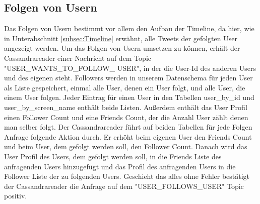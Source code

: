 \subsection{Folgen von Usern}
Das Folgen von Usern bestimmt vor allem den Aufbau der Timeline, da hier, wie in Unterabschnitt \ref{subsec:Timeline} erwähnt, alle Tweets der gefolgten User angezeigt werden. Um das Folgen von Usern umsetzen zu können, erhält der Cassandrareader einer Nachricht auf dem Topic "USER\_WANTS\_TO\_FOLLOW\_ USER", in der die User-Id des anderen Users und des eigenen steht. Followers werden in unserem Datenschema für jeden User als Liste gespeichert, einmal alle User, denen ein User folgt, und alle User, die einem User folgen. Jeder Eintrag für einen User in den Tabellen user\_by\_id und user\_by\_screen\_name enthält beide Listen. Außerdem enthält das User Profil einen Follower Count und eine Friends Count, der die Anzahl User zählt denen man selber folgt. Der Cassandrareader führt auf beiden Tabellen für jede Folgen Anfrage folgende Aktion durch. Er erhöht beim eigenen User den Friends Count und beim User, dem gefolgt werden soll, den Follower Count. Danach wird das User Profil des Users, dem gefolgt werden soll, in die Friends Liste des anfragenden Users hinzugefügt und das Profil des anfragenden Users in die Follower Liste der zu folgenden Users. Geschieht das alles ohne Fehler bestätigt der Cassandrareader die Anfrage auf dem "USER\_FOLLOWS\_USER" Topic positiv.
